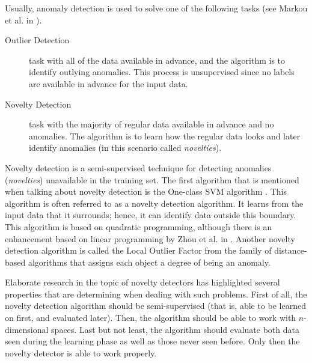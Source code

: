 
Usually, anomaly detection is used to solve one of the following tasks (see Markou et al. in \cite{MARKOU20032481}).
\begin{description}
    \item[Outlier Detection]  task with all of the data available in advance, and the algorithm is to identify outlying anomalies. This process is unsupervised since no labels are available in advance for the input data.
    \item[Novelty Detection]  task with the majority of regular data available in advance and no anomalies. The algorithm is to learn how the regular data looks and later identify anomalies (in this scenario called \emph{novelties}).
\end{description}

Novelty detection is a semi-supervised technique for detecting anomalies (\emph{novelties}) unavailable in the training set.
The first algorithm that is mentioned when talking about novelty detection is the One-class SVM algorithm \cite{tax2004support}. This algorithm is often referred to as a novelty detection algorithm. It learns from the input data that it surrounds; hence, it can identify data outside this boundary.
This algorithm is based on quadratic programming, although there is an enhancement based on linear programming by Zhou et al. in \cite{ZHOU20022927}.
Another novelty detection algorithm is called the Local Outlier Factor from the family of distance-based algorithms \cite{breunig2000lof} that assigns each object a degree of being an anomaly.



Elaborate research in the topic of novelty detectors has highlighted several properties that are determining when dealing with such problems. First of all, the novelty detection algorithm should be semi-supervised (that is, able to be learned on first, and evaluated later). Then, the algorithm should be able to work with \(n\)-dimensional spaces. Last but not least, the algorithm should evaluate both data seen during the learning phase as well as those never seen before. Only then the novelty detector is able to work properly. 

